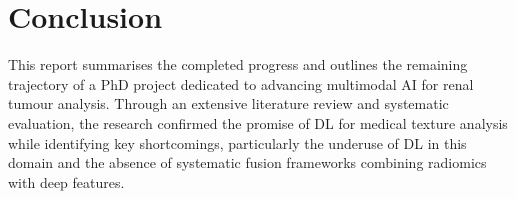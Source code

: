 \documentclass[final,british,a4paper,12pt]{phdthesis}
\begin{document}
											



\chapter{Conclusion}





This report summarises the completed progress and outlines the remaining trajectory of a PhD project dedicated to advancing multimodal AI for renal tumour analysis. Through an extensive literature review and systematic evaluation, the research confirmed the promise of DL for medical texture analysis while identifying key shortcomings, particularly the underuse of DL in this domain and the absence of systematic fusion frameworks combining radiomics with deep features.
\end{document}
